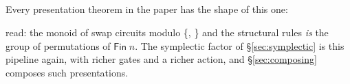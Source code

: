 \begin{code}%
\>[0]\AgdaSpace{}%
\AgdaSpace{}%
\AgdaSymbol{(}\AgdaOperator{\AgdaBound{\AgdaUnderscore{}===\AgdaUnderscore{}}}\AgdaSpace{}%
\AgdaSymbol{:}\AgdaSpace{}%
\AgdaSpace{}%
\AgdaSymbol{)}\AgdaSpace{}%
\AgdaSymbol{(}\AgdaSpace{}%
\AgdaSymbol{:}\AgdaSpace{}%
\AgdaSpace{}%
\AgdaSpace{}%
\AgdaSymbol{)}\AgdaSpace{}%
\AgdaSymbol{:}\AgdaSpace{}%
\AgdaSpace{}%
\AgdaSymbol{(}\AgdaSpace{}%
\AgdaSpace{}%
\AgdaSymbol{)}\AgdaSpace{}%
\<%
\\
\>[0][@{}l@{\AgdaIndent{0}}]%
\>[2]\<%
\\
\>[2][@{}l@{\AgdaIndent{0}}]%
\>[4]%
\>[8]\AgdaSymbol{:}\AgdaSpace{}%
\AgdaSpace{}%
\AgdaOperator{\AgdaBound{\AgdaUnderscore{}===\AgdaUnderscore{}}}\<%
\\
%
\>[4]\AgdaSpace{}%
\AgdaSymbol{:}\AgdaSpace{}%
\AgdaSpace{}%
\AgdaSpace{}%
\AgdaSpace{}%
\AgdaSpace{}%
\<%
\\
%
\>[4]\AgdaSpace{}%
\AgdaSymbol{:}\AgdaSpace{}%
\AgdaSpace{}%
\<%
\end{code}

\noindent Every presentation theorem in the paper has the shape of this
one:

\begin{code}%
\>[0]\AgdaSpace{}%
\AgdaSymbol{:}\AgdaSpace{}%
\AgdaSpace{}%
\AgdaSpace{}%
\AgdaSpace{}%
\AgdaSymbol{(}\AgdaSpace{}%
\AgdaSymbol{)}\AgdaSpace{}%
\AgdaSpace{}%
\AgdaSymbol{(}\AgdaSpace{}%
\AgdaSymbol{)}\<%
\end{code}
\begin{code}[hide]%
\>[0]\AgdaSpace{}%
\AgdaSpace{}%
\AgdaSymbol{=}\AgdaSpace{}%
\AgdaSpace{}%
\AgdaSymbol{\{}\AgdaSymbol{\}}\<%
\end{code}

\noindent read: the monoid of swap circuits modulo \{,
\} and the structural rules \emph{is} the group of
permutations of $\mathsf{Fin}\;n$.  The symplectic
factor of \S\ref{sec:symplectic} is this pipeline again, with richer
gates and a richer action, and \S\ref{sec:composing} composes such
presentations.

